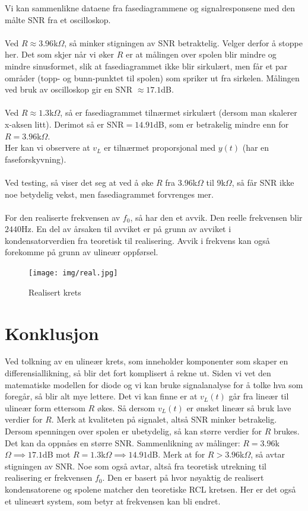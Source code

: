 \documentclass[a4paper,11pt,norsk]{article}
\begin{document}
Vi kan sammenlikne dataene fra fasediagrammene og signalresponsene med den målte SNR fra et oscilloskop. \\\\
Ved $R \approx 3.96$k$\Omega$, så minker stigningen av SNR betraktelig. Velger derfor å stoppe her. Det som skjer når vi øker $R$ er at målingen over spolen blir mindre og mindre sinusformet, slik at fasediagrammet ikke blir sirkulært, men får et par områder (topp- og bunn-punktet til spolen) som spriker ut fra sirkelen.
Målingen ved bruk av oscilloskop gir en SNR $\approx 17.1$dB.
\\\\
Ved $R \approx 1.3$k$\Omega$, så er fasediagrammet tilnærmet sirkulært (dersom man skalerer x-aksen litt). Derimot så er SNR$=14.91$dB, som er betrakelig mindre enn for $R = 3.96$k$\Omega$. \\
Her kan vi observere at $v_L$ er tilnærmet proporsjonal med $y(t)$ (har en faseforskyvning).
\\\\
Ved testing, så viser det seg at ved å øke $R$ fra $3.96$k$\Omega$ til $9$k$\Omega$, så får SNR ikke noe betydelig vekst, men fasediagrammet forvrenges mer.
\\\\
For den realiserte frekvensen av $f_0$, så har den et avvik. Den reelle frekvensen blir $2440$Hz. En del av årsaken til avviket er på grunn av avviket i kondensatorverdien fra teoretisk til realisering. Avvik i frekvens kan også forekomme på grunn av ulineær oppførsel.
\newpage

\begin{figure}[htbp]
    \centering
    \texttt{[image: img/real.jpg]}
    \caption{Realisert krets}
    \label{fig:realkrets}
\end{figure}

\newpage
\section{Konklusjon}
\label{sec:konklusjon}
Ved tolkning av en ulineær krets, som inneholder komponenter som skaper en differensiallikning, så blir det fort komplisert å rekne ut. Siden vi vet den matematiske modellen for diode og vi kan bruke signalanalyse for å tolke hva som foregår, så blir alt mye lettere. Det vi kan finne er at $v_L(t)$ går fra lineær til ulineær form ettersom $R$ økes. Så dersom $v_L(t)$ er ønsket lineær så bruk lave verdier for $R$. Merk at kvaliteten på signalet, altså SNR minker betrakelig. Dersom spenningen over spolen er ubetydelig, så kan større verdier for $R$ brukes. Det kan da oppnåes en større SNR.
Sammenlikning av målinger: $R = 3.96$k$\Omega \implies 17.1$dB mot $R = 1.3$k$\Omega \implies 14.91$dB. Merk at for $R > 3.96$k$\Omega$, så avtar stigningen av SNR. Noe som også avtar, altså fra teoretisk utrekning til realisering er frekvensen $f_0$. Den er basert på hvor nøyaktig de realisert kondensatorene og spolene matcher den teoretiske RCL kretsen. Her er det også et ulineært system, som betyr at frekvensen kan bli endret.
\end{document}
